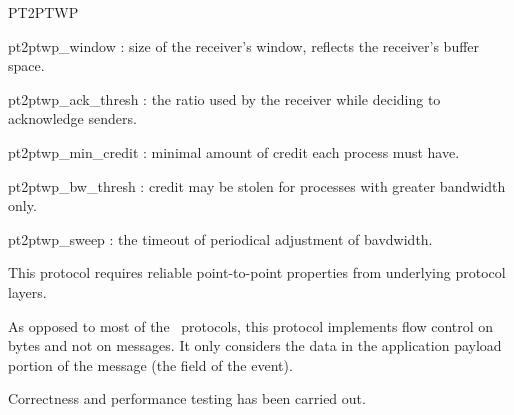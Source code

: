 \begin{Layer}{PT2PTWP}
\begin{Parameters}
\item pt2ptwp\_window : size of the receiver's window, reflects the receiver's 
buffer space.
\item pt2ptwp\_ack\_thresh : the ratio used by the receiver while deciding 
to acknowledge senders.
\item pt2ptwp\_min\_credit : minimal amount of credit each process must have.
\item pt2ptwp\_bw\_thresh : credit may be stolen for processes with greater 
bandwidth only.
\item pt2ptwp\_sweep : the timeout of periodical adjustment of bavdwidth.
\end{Parameters}

\begin{Properties}
\item
This protocol requires reliable point-to-point properties from underlying 
protocol layers.
\end{Properties}

\begin{Notes}
\item
As opposed to most of the \ensemble\ protocols, this protocol implements flow
control on bytes and not on messages. It only considers the data in the
application payload portion of the message (the  field of the
event).
\end{Notes}

\begin{Sources}
\end{Sources}

\begin{Testing}
\item
Correctness and performance testing has been carried out.
\end{Testing}

\end{Layer}
